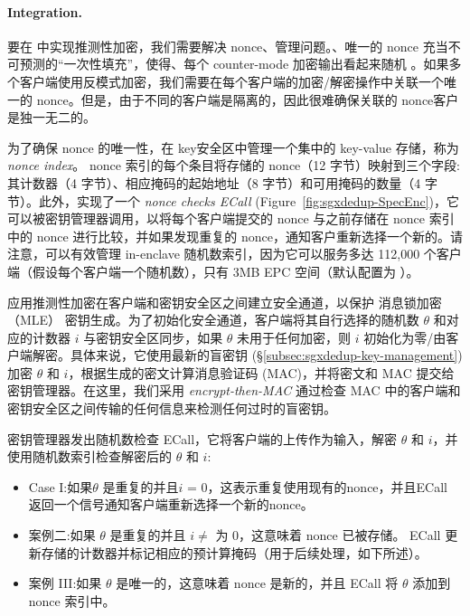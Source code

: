\paragraph*{Integration.} 要在 \sysnameS 中实现推测性加密，我们需要解决 nonce、管理问题。、唯一的 nonce 充当不可预测的“一次性填充”，使得、每个 counter-mode 加密输出看起来随机 \cite{counter}。如果多个客户端使用反模式加密，我们需要在每个客户端的加密/解密操作中关联一个唯一的 nonce。但是，由于不同的客户端是隔离的，因此很难确保关联的 nonce客户是独一无二的。

为了确保 nonce 的唯一性，\sysnameS 在 key安全区中管理一个集中的 key-value 存储，称为 \textit{ nonce index}。 nonce 索引的每个条目将存储的 nonce（12 字节）映射到三个字段:其计数器（4 字节）、相应掩码的起始地址（8 字节）和可用掩码的数量（4 字节）。此外，\sysnameS 实现了一个 \textit{ nonce checks ECall} (Figure~\ref{fig:sgxdedup-SpecEnc})，它可以被密钥管理器调用，以将每个客户端提交的 nonce 与之前存储在 nonce 索引中的 nonce 进行比较，并如果发现重复的 nonce，通知客户重新选择一个新的。请注意，可以有效管理 in-enclave 随机数索引，因为它可以服务多达 112,000 个客户端（假设每个客户端一个随机数），只有 3MB EPC 空间（默认配置为 \sysnameS）。

\sysnameS 应用推测性加密在客户端和密钥安全区之间建立安全通道，以保护 消息锁加密（MLE） 密钥生成。为了初始化安全通道，客户端将其自行选择的随机数 $\theta$ 和对应的计数器 $i$ 与密钥安全区同步，如果 $\theta$ 未用于任何加密，则 $i$ 初始化为零/由客户端解密。具体来说，它使用最新的盲密钥 (\S\ref{subsec:sgxdedup-key-management}) 加密 $\theta$ 和 $i$，根据生成的密文计算消息验证码 (MAC)，并将密文和 MAC 提交给密钥管理器。在这里，我们采用 \textit{ encrypt-then-MAC} \cite{bellare00} 通过检查 MAC 中的客户端和密钥安全区之间传输的任何信息来检测任何过时的盲密钥。

密钥管理器发出随机数检查 ECall，它将客户端的上传作为输入，解密 $\theta$ 和 $i$，并使用随机数索引检查解密后的 $\theta$ 和 $i$:
%
\begin{itemize}[leftmargin=*]
\item Case I:如果$\theta$ 是重复的并且$i$ = 0，这表示重复使用现有的nonce，并且ECall 返回一个信号通知客户端重新选择一个新的nonce。
\item 案例二:如果 $\theta$ 是重复的并且 $i \neq$ 为 0，这意味着 nonce 已被存储。 ECall 更新存储的计数器并标记相应的预计算掩码（用于后续处理，如下所述）。
\item 案例 III:如果 $\theta$ 是唯一的，这意味着 nonce 是新的，并且 ECall 将 $\theta$ 添加到 nonce 索引中。
\end{itemize}

